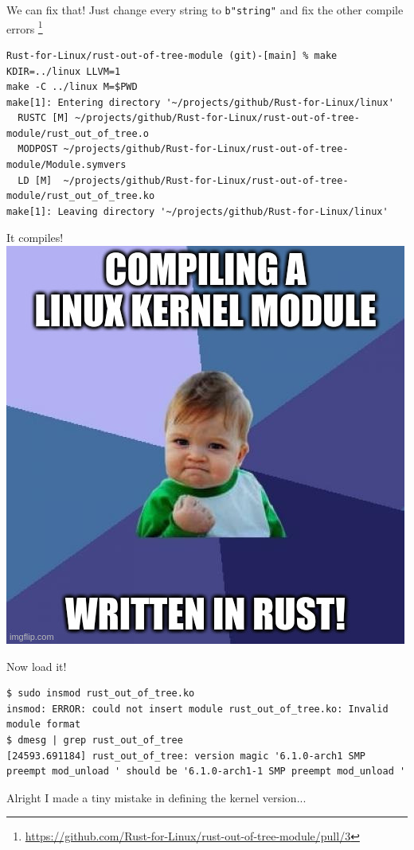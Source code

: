 \begin{frame}[c,fragile]{We can fix that!}
Just change every string to \texttt{b"string"} and fix the other compile errors
\footnote{\url{https://github.com/Rust-for-Linux/rust-out-of-tree-module/pull/3}}
\pause
\begin{verbatim}
Rust-for-Linux/rust-out-of-tree-module (git)-[main] % make KDIR=../linux LLVM=1
make -C ../linux M=$PWD
make[1]: Entering directory '~/projects/github/Rust-for-Linux/linux'
  RUSTC [M] ~/projects/github/Rust-for-Linux/rust-out-of-tree-module/rust_out_of_tree.o
  MODPOST ~/projects/github/Rust-for-Linux/rust-out-of-tree-module/Module.symvers
  LD [M]  ~/projects/github/Rust-for-Linux/rust-out-of-tree-module/rust_out_of_tree.ko
make[1]: Leaving directory '~/projects/github/Rust-for-Linux/linux'
\end{verbatim}
\end{frame}

\begin{frame}[c]{It compiles!}
  \centering
  \includegraphics[height=0.8\textheight]{img/compiling-linux-kernel-module-in-rust.jpg}
\end{frame}

\begin{frame}[c,fragile]{Now load it!}
\begin{verbatim}
$ sudo insmod rust_out_of_tree.ko
insmod: ERROR: could not insert module rust_out_of_tree.ko: Invalid module format
$ dmesg | grep rust_out_of_tree
[24593.691184] rust_out_of_tree: version magic '6.1.0-arch1 SMP preempt mod_unload ' should be '6.1.0-arch1-1 SMP preempt mod_unload '
\end{verbatim}
\pause Alright I made a tiny mistake in defining the kernel version...
\end{frame}

